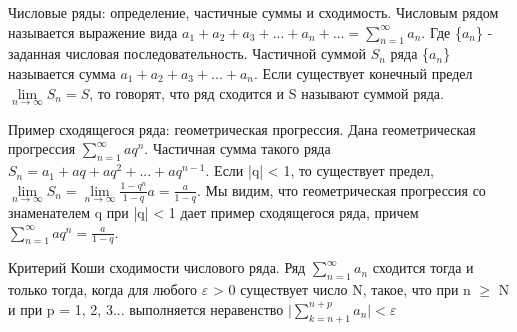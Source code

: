 \documentclass[12pt, a4paper]{article}
\newenvironment{field}{}{\newpage}
\newif\ifnote
\newenvironment{note}{\notetrue}{\notefalse}
\newcommand{\localtag}{}
\newcommand{\globaltag}{}
\newcommand{\tags}[1]{
    \ifnote
        \renewcommand{\localtag}{#1}
    \else
        \renewcommand{\globaltag}{#1}
    \fi
    }
\begin{document}

\tags{rk1}


\begin{note}
\begin{field}
Числовые ряды: определение, частичные суммы и сходимость.
\end{field}
\begin{field}
Числовым рядом называется выражение вида $a_1 + a_2 + a_3 + ...+ a_n + \ldots =  \sum\limits_{n=1}^{\infty}a_{n}$. Где \{$a_n$\} - заданная числовая последовательность.
Частичной суммой $S_{n}$ ряда \{$a_{n}$\}  называется сумма $a_{1} + a_{2} + a_{3} + ... + a_{n}$. Если существует конечный предел $\lim\limits_{n \to \infty} S_{n} = S$, то говорят, что ряд сходится и S называют суммой ряда.
\end{field}
\end{note}

\begin{note}
\begin{field}
Пример сходящегося ряда: геометрическая прогрессия.
\end{field}
\begin{field}
Дана геометрическая прогрессия $\sum\limits_{n=1}^{\infty}aq^n$. Частичная сумма такого ряда $S_n = a_1 + aq + aq^2 + ... + aq^{n-1}$. Если |q| < 1, то существует предел, $\lim\limits_{n \to \infty}S_n = \lim\limits_{n \to \infty}\frac{1 - q^n}{1 - q}a = \frac{a}{1 - q}$. Мы видим, что геометрическая прогрессия со знаменателем q при |q| < 1 дает пример сходящегося ряда, причем  $\sum_{n=1}^{\infty}aq^n = \frac{a}{1 - q}$.

\end{field}
\end{note}

\begin{note}
\begin{field}
Критерий Коши сходимости числового ряда.
\end{field}
\begin{field}
Ряд  $\sum\limits_{n=1}^{\infty}a_n$ сходится тогда и только тогда, когда для любого $\varepsilon$ > 0 существует число N, такое, что при n $\geq$ N и при p = 1, 2, 3... выполняется неравенство $\mid  \sum\limits_{k=n+1}^{n + p}a_n \mid < \varepsilon$

\end{field}
\end{note}
\end{document}
